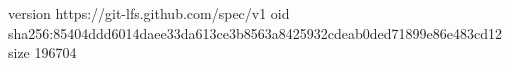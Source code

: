 version https://git-lfs.github.com/spec/v1
oid sha256:85404ddd6014daee33da613ce3b8563a8425932cdeab0ded71899e86e483cd12
size 196704

